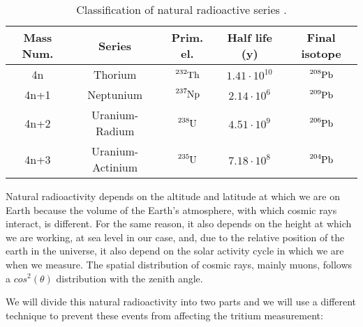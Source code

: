 \begin{table}[htbp]
\begin{center}
\begin{tabular}{|c|c|c|c|c|}
\hline
Mass Num. & Series & Prim. el. & Half life (y) & Final isotope \\
\hline \hline \hline
4n & Thorium & $\ce{^{232}Th}$ & $1.41 \cdot{} 10^{10}$ & $\ce{^{208}Pb}$ \\ \hline
4n+1 & Neptunium & $\ce{^{237}Np}$ & $2.14 \cdot{} 10^{6}$ & $\ce{^{209}Pb}$ \\ \hline
4n+2 & Uranium-Radium & $\ce{^{238}U}$ & $4.51 \cdot{} 10^{9}$ & $\ce{^{206}Pb}$ \\ \hline
4n+3 & Uranium-Actinium & $\ce{^{235}U}$ & $7.18 \cdot{} 10^{8}$ & $\ce{^{204}Pb}$ \\ \hline
\end{tabular}
\caption{Classification of natural radioactive series \cite{NaturalRadioactiveSeries1, NaturalRadioactiveSeries2}.}
\label{tab:NaturalRadioactiveSeries}
\end{center}
\end{table}

Natural radioactivity depends on the altitude and latitude at which we are on Earth because the volume of the Earth's atmosphere, with which cosmic rays interact, is different. For the same reason, it also depends on the height at which we are working, at sea level in our case, and, due to the relative position of the earth in the universe, it also depend on the solar activity cycle in which we are when we measure. The spatial distribution of cosmic rays, mainly muons, follows a $cos^2(\theta)$ distribution with the zenith angle. %

We will divide this natural radioactivity into two parts and we will use a different technique to prevent these events from affecting the tritium measurement:

